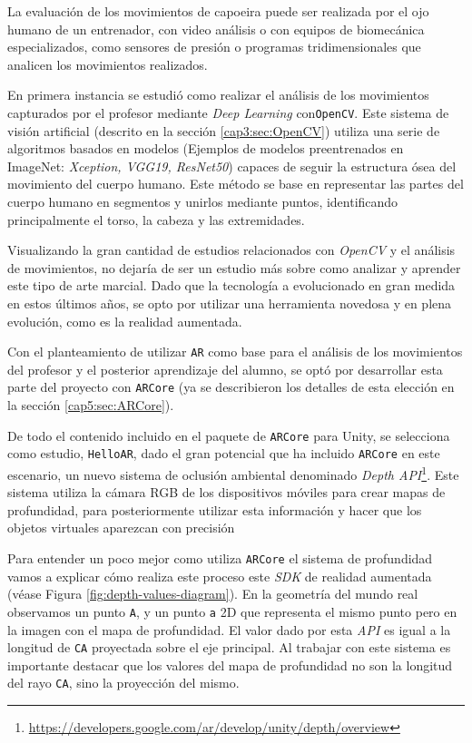 La evaluación de los movimientos de capoeira puede ser realizada por el ojo humano de un entrenador, con video análisis o con equipos de biomecánica especializados, como sensores de presión o programas tridimensionales que analicen los movimientos realizados. 

En primera instancia se estudió como realizar el análisis de los movimientos capturados por el profesor mediante \textit{Deep Learning} con\texttt{OpenCV}. Este sistema de visión artificial (descrito en la sección \ref{cap3:sec:OpenCV}) utiliza una serie de algoritmos basados en modelos (Ejemplos de modelos preentrenados en ImageNet: \textit{Xception, VGG19, ResNet50}) capaces de seguir la estructura ósea del movimiento del cuerpo humano. Este método se base en representar las partes del cuerpo humano en segmentos y unirlos mediante puntos, identificando principalmente el torso, la cabeza y las extremidades.

Visualizando la gran cantidad de estudios relacionados con \textit{OpenCV} y el análisis de movimientos, no dejaría de ser un estudio más sobre como analizar y aprender este tipo de arte marcial. Dado que la tecnología a evolucionado en gran medida en estos últimos años, se opto por utilizar una herramienta novedosa y en plena evolución, como es la realidad aumentada.

Con el planteamiento de utilizar \texttt{AR} como base para el análisis de los movimientos del profesor y el posterior aprendizaje del alumno, se optó por desarrollar esta parte del proyecto con \texttt{ARCore} (ya se describieron los detalles de esta elección en la sección \ref{cap5:sec:ARCore}).

De todo el contenido incluido en el paquete de \texttt{ARCore} para Unity, se selecciona como estudio, \texttt{HelloAR}, dado el gran potencial que ha incluido \texttt{ARCore} en este escenario, un nuevo sistema de oclusión ambiental denominado \textit{Depth API}\footnote{\url{https://developers.google.com/ar/develop/unity/depth/overview}}. Este sistema utiliza la cámara RGB de los dispositivos móviles para crear mapas de profundidad, para posteriormente utilizar esta información y hacer que los objetos virtuales aparezcan con precisión 

Para entender un poco mejor como utiliza \texttt{ARCore} el sistema de profundidad vamos a explicar cómo realiza este proceso este \textit{SDK} de realidad aumentada (véase Figura \ref{fig:depth-values-diagram}). En la geometría del mundo real observamos un punto \texttt{A}, y un punto \texttt{a} 2D que representa el mismo punto pero en la imagen con el mapa de profundidad. El valor dado por esta \textit{API} es igual a la longitud de \texttt{CA} proyectada sobre el eje principal. Al trabajar con este sistema es importante destacar que los valores del mapa de profundidad no son la longitud del rayo \texttt{CA}, sino la proyección del mismo.

